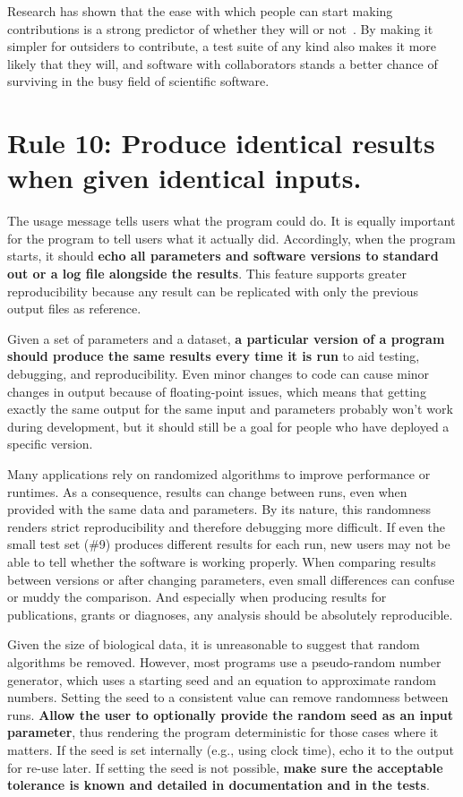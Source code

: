 \documentclass[10pt,letterpaper]{article}
\newcommand{\rulemajor}[1]{\section{#1}}
\newcommand{\ruleminor}[1]{\textbf{#1}}
\begin{document}
Research has shown that the ease with which people can start making
contributions is a strong predictor of whether they will or not~\cite{steinmacher2015}.
By making it simpler for outsiders to contribute,
a test suite of any kind also makes it more likely that they will, and software
with collaborators stands a better chance of surviving in the busy field of
scientific software.

\rulemajor{Rule 10: Produce identical results when given identical inputs.}

The usage message tells users what the program could do.
It is equally important for the program to tell users what it actually did.
Accordingly,
when the program starts, it should \ruleminor{echo all parameters and software
versions to standard out or a log file alongside the results}. This
feature supports greater reproducibility because any result can be
replicated with only the previous output files as reference.

Given a set of parameters and a dataset, \ruleminor{a particular version of a program
should produce the same results every time it is run}
to aid testing, debugging, and reproducibility.
Even minor changes to code can cause minor changes in output because of floating-point issues,
which means that getting exactly the same output for the same input and parameters
probably won't work during development,
but it should still be a goal for people who have deployed a specific version.

Many applications rely on randomized algorithms to
improve performance or runtimes. As a consequence, results can change
between runs, even when provided with the same data and parameters. By
its nature, this randomness renders strict reproducibility and therefore
debugging more difficult. If even the small test set (\#9) produces
different results for each run, new users may not be able to tell whether the software is
working properly. When comparing
results between versions or after changing parameters, even small
differences can confuse or muddy the comparison. And especially when
producing results for publications, grants or diagnoses, any analysis
should be absolutely reproducible.

Given the size of biological data, it is unreasonable to suggest that
random algorithms be removed. However, most programs use a pseudo-random
number generator, which uses a starting seed and an equation to
approximate random numbers. Setting the seed to a consistent value
can remove randomness between runs. \ruleminor{Allow the user to optionally provide
the random seed as an input parameter}, thus rendering the program deterministic
for those cases where it matters. If the seed is set internally (e.g.,
using clock time), echo it to the output for re-use later. 
If setting the seed is not possible, \ruleminor{make sure the acceptable tolerance is
known and detailed in documentation and in the tests}.
\end{document}
